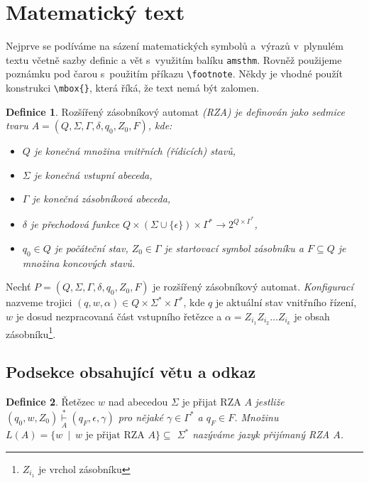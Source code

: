 \documentclass[11pt,twocolumn,a4paper]{article}
\theoremstyle{definition}
\newtheorem{definition}{Definice}
\newcommand{\stepover}[2]{\underset{#2}{\overset{#1}{\vdash}}}
\begin{document}
\section{Matematický text}
Nejprve se podíváme na sázení matematických symbolů a~výrazů v~plynulém textu včetně sazby definic a vět s~využitím balíku \texttt{amsthm}. 
Rovněž použijeme poznámku pod čarou s~použitím příkazu \verb|\footnote|. 
Někdy je vhodné použít konstrukci \verb|\mbox{}|, která říká, že text nemá být zalomen.
\begin{definition}
\label{def1}
    Rozšířený zásobníkový automat \emph{(RZA) je definován jako sedmice tvaru $A =  (Q,\Sigma,\Gamma,\delta,q_0,Z_0,F)$, kde:}
    \renewcommand\labelitemi{$\bullet$}
    \begin{itemize}
      \item \emph{$Q$ je konečná množina \textnormal{vnitřních (řídicích) stavů},}
      \item \emph{$\Sigma$ je konečná \textnormal{vstupní abeceda},}
      \item \emph{$\Gamma$ je konečná \textnormal{zásobníková abeceda},}
      \item \emph{$\delta$ je \textnormal{přechodová funkce} $Q \times (\Sigma\cup\{\epsilon\}) \times \Gamma^*\to 2^{Q\times\Gamma^*}$,}
      \item \emph{$q_0 \in Q$ je \textnormal{počáteční stav}, $Z_0 \in \Gamma$ je \textnormal{startovací symbol zásobníku} a $F \subseteq Q$ je množina \textnormal{koncových stavů}.}
    \end{itemize}

\end{definition}

Nechť $P =  (Q,\Sigma,\Gamma,\delta,q_0,Z_0,F)$ je rozšířený zásobníkový automat. \emph{Konfigurací} nazveme trojici $(q,w,\alpha) \in Q \times \Sigma^* \times \Gamma^*$, kde $q$ je aktuální stav vnitřního řízení, $w$ je dosud nezpracovaná část vstupního řetězce a $\alpha = Z_{i_1} Z_{i_2}\ldots Z_{i_k}$ je obsah zásobníku\footnote[1]{$Z_{i_1}$ je vrchol zásobníku}.

\subsection{Podsekce obsahující větu a odkaz}
\begin{definition}
\label{def2}
    Řetězec $w$ nad abecedou $\Sigma$ je přijat RZA 
    $A$ \emph{jestliže $( q_0, w, Z_0 ) \stepover{*}{A} (q_F, \epsilon, \gamma)$ pro nějaké $\gamma \in \Gamma^*$ a
    $q_F \in F$. Množinu $L(A)=\{ w \ \mid \ w \text{ je přijat RZA } A \} \subseteq$
    $\Sigma^*$ nazýváme \textnormal{jazyk přijímaný RZA} $A$.}
\end{definition}
\end{document}
